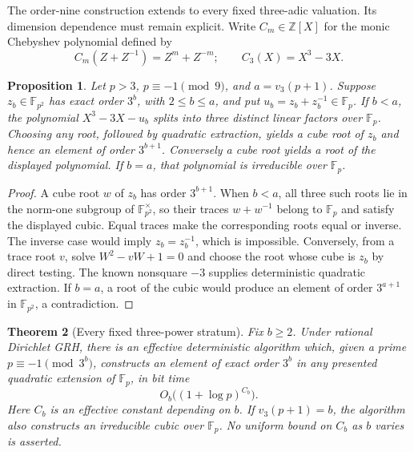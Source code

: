 \documentclass[11pt]{article}
\newtheorem{theorem}{Theorem}[section]
\newtheorem{proposition}[theorem]{Proposition}
\theoremstyle{definition}
\theoremstyle{remark}
\begin{document}
The order-nine construction extends to every fixed three-adic
valuation. Its dimension dependence must remain explicit. Write
\(C_m\in\mathbb Z[X]\) for the monic Chebyshev polynomial
defined by
\[
 C_m(Z+Z^{-1})=Z^m+Z^{-m};\qquad C_3(X)=X^3-3X.
\]

\begin{proposition}\label{prop:kummer-trace-cubic-lift}
Let \(p>3\), \(p\equiv-1\pmod9\), and
\(a=v_3(p+1)\). Suppose \(z_b\in\mathbb F_{p^2}\) has
exact order \(3^b\), with \(2\le b\le a\), and put
\(u_b=z_b+z_b^{-1}\in\mathbb F_p\).
If \(b<a\), the polynomial \(X^3-3X-u_b\) splits into
three distinct linear factors over \(\mathbb F_p\).
Choosing any root, followed by quadratic extraction, yields a
cube root of \(z_b\) and hence an element of order
\(3^{b+1}\). Conversely a cube root yields a root of the
displayed polynomial. If \(b=a\), that polynomial is
irreducible over \(\mathbb F_p\).
\end{proposition}
\begin{proof}
A cube root \(w\) of \(z_b\) has order \(3^{b+1}\).
When \(b<a\), all three such roots lie in the norm-one
subgroup of \(\mathbb F_{p^2}^\times\), so their traces
\(w+w^{-1}\) belong to \(\mathbb F_p\) and satisfy the
displayed cubic. Equal traces make the corresponding roots
equal or inverse. The inverse case would imply
\(z_b=z_b^{-1}\), which is impossible. Conversely, from a
trace root \(v\), solve \(W^2-vW+1=0\) and choose the root
whose cube is \(z_b\) by direct testing. The known nonsquare
\(-3\) supplies deterministic quadratic extraction. If
\(b=a\), a root of the cubic would produce an element of
order \(3^{a+1}\) in \(\mathbb F_{p^2}\), a contradiction.
\end{proof}

\begin{theorem}[Every fixed three-power stratum]\label{thm:kummer-fixed-three-power-stratum}
Fix \(b\ge2\). Under rational Dirichlet GRH, there is an
effective deterministic algorithm which, given a prime
\(p\equiv-1\pmod{3^b}\), constructs an element of exact order
\(3^b\) in any presented quadratic extension of
\(\mathbb F_p\), in bit time
\[
 O_b\bigl((1+\log p)^{C_b}\bigr).
\]
Here \(C_b\) is an effective constant depending on \(b\).
If \(v_3(p+1)=b\), the algorithm also constructs an irreducible
cubic over \(\mathbb F_p\). No uniform bound on \(C_b\)
as \(b\) varies is asserted.
\end{theorem}
\end{document}
